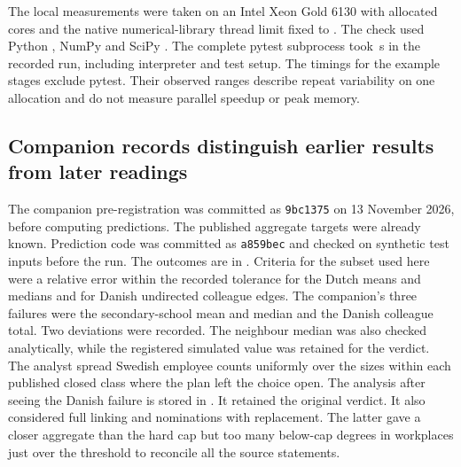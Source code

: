 The local measurements were taken on an Intel Xeon Gold 6130 with \CpuCount{} allocated cores and the native numerical-library thread limit fixed to \ThreadCount{}. The check used Python \PythonVersion{}, NumPy \NumpyVersion{} and SciPy \ScipyVersion{}. The complete pytest subprocess took \TestTime{}\,s in the recorded run, including interpreter and test setup. The timings for the example stages exclude pytest. Their observed ranges describe repeat variability on one allocation and do not measure parallel speedup or peak memory.

\subsection{Companion records distinguish earlier results from later readings}

The companion pre-registration  was committed as \texttt{9bc1375} on 13 November 2026, before computing predictions. The published aggregate targets were already known. Prediction code was committed as \texttt{a859bec} and checked on synthetic test inputs before the run. The outcomes are in . Criteria for the subset used here were a relative error within the recorded tolerance for the Dutch means and medians and for Danish undirected colleague edges. The companion's three failures were the secondary-school mean and median and the Danish colleague total. Two deviations were recorded. The neighbour median was also checked analytically, while the registered simulated value was retained for the verdict. The analyst spread Swedish employee counts uniformly over the sizes within each published closed class where the plan left the choice open. The analysis after seeing the Danish failure is stored in . It retained the original verdict. It also considered full linking and nominations with replacement. The latter gave a closer aggregate than the hard cap but too many below-cap degrees in workplaces just over the threshold to reconcile all the source statements.

